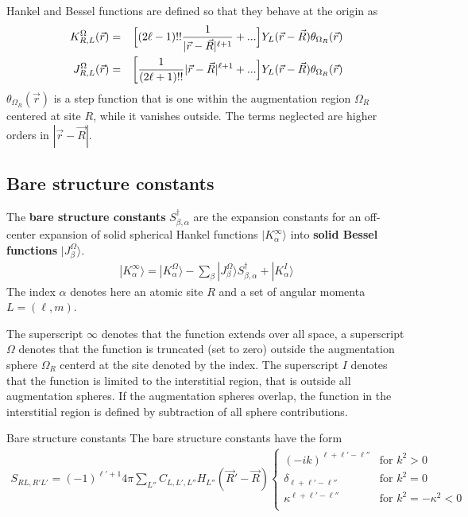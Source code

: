 \documentclass[11pt,a4paper]{report}
\begin{document}
Hankel and Bessel functions are defined so that they behave at the
origin as
\begin{eqnarray}
K^\Omega_{R,L}(\vec{r})&=&
\Bigl[(2\ell-1)!! \frac{1}{|\vec{r}-\vec{R}|^{\ell+1}} 
+...\Bigr]
Y_L(\vec{r}-\vec{R})\theta_{\Omega_R}(\vec{r})
\\
J^\Omega_{R,L}(\vec{r})&=&
\biggl[\frac{1}{(2\ell+1)!!} |\vec{r}-\vec{R}|^{\ell+1} 
+...\Bigr]Y_L(\vec{r}-\vec{R})\theta_{\Omega_R}(\vec{r})
\end{eqnarray}
$\theta_{\Omega_R}(\vec{r})$ is a step function that is one within the
augmentation region $\Omega_R$ centered at site $R$, while it vanishes
outside. The terms neglected are higher orders in $|\vec{r}-\vec{R}|$.

\subsection{Bare structure constants}
The \textbf{bare structure constants}
$S^\dagger_{\beta,\alpha}$ are the expansion constants for an
off-center expansion of solid spherical Hankel functions $|K_{\alpha}^\infty\rangle$ into \textbf{solid Bessel
  functions} $|J^\Omega_{\beta}\rangle$.
\begin{eqnarray}
|K_{\alpha}^\infty\rangle=|K^\Omega_{\alpha}\rangle
-\sum_{\beta}|J^\Omega_{\beta}\rangle S^\dagger_{\beta,\alpha}
+|K^I_{\alpha}\rangle
\end{eqnarray}
The index $\alpha$ denotes here an atomic site $R$ and a set of
angular momenta $L=(\ell,m)$.

The superscript $\infty$ denotes that the function extends over all
space, a superscript $\Omega$ denotes that the function is truncated
(set to zero) outside the augmentation sphere $\Omega_{R}$ centerd at
the site denoted by the index. The superscript $I$ denotes that the
function is limited to the interstitial region, that is outside all
augmentation spheres. If the augmentation spheres overlap, the
function in the interstitial region is defined by subtraction of all
sphere contributions.



\begin{myshadowminipage}{Bare structure constants}
The bare structure constants have the form
\begin{eqnarray}
S_{RL,R'L'}=(-1)^{\ell'+1} 4\pi \sum_{L''} C_{L,L',L''} 
H_{L''}(\vec{R}'-\vec{R})
\begin{cases}
(-ik)^{\ell+\ell'-\ell''}&\text{for $k^2>0$}\\
\delta_{\ell+\ell'-\ell''}&\text{for $k^2=0$}\\
\kappa^{\ell+\ell'-\ell''}&\text{for $k^2=-\kappa^2<0$}\\
\end{cases}
\label{eq:fortmulaforbarestructureconstants}
\end{eqnarray}
\end{myshadowminipage}
\end{document}
